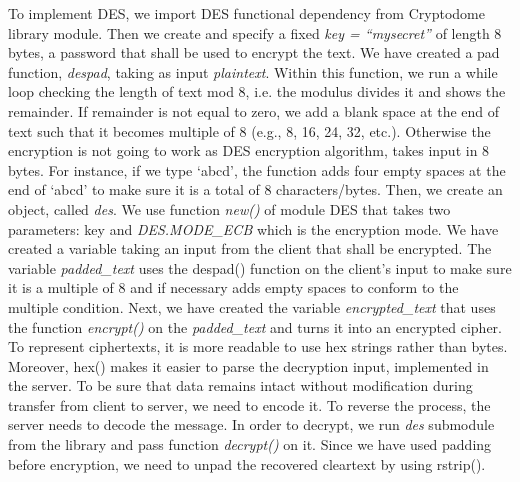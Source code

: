 To implement DES, we import DES functional dependency from Cryptodome library module. Then we create and specify a fixed \textit{key = “mysecret”} of length 8 bytes, a password that shall be used to encrypt the text. We have created a pad function, \textit{despad}, taking as input \textit{plaintext}. Within this function, we run a while loop checking the length of text mod 8, i.e. the modulus divides it and shows the remainder. If remainder is not equal to zero, we add a blank space at the end of text such that it becomes multiple of 8 (e.g., 8, 16, 24, 32, etc.). Otherwise the encryption is not going to work as DES encryption algorithm, takes input in 8 bytes. For instance, if we type ‘abcd’, the function adds four empty spaces at the end of ‘abcd’ to make sure it is a total of 8 characters/bytes. Then, we create an object, called \textit{des}. We use function \textit{new()} of module DES that takes two parameters: key and \textit{DES.MODE\_ECB} which is the encryption mode. We have created a variable taking an input from the client that shall be encrypted. The variable  \textit{padded\_text} uses the despad() function on the client's input to make sure it is a multiple of 8 and if necessary adds empty spaces to conform to the multiple condition. Next, we have created the variable \textit{encrypted\_text} that uses the function \textit{encrypt()} on the \textit{padded\_text} and turns it into an encrypted cipher. To represent ciphertexts, it is more readable to use hex strings rather than bytes. Moreover, hex() makes it easier to parse the decryption input, implemented in the server. To be sure that data remains intact without modification during transfer from client to server, we need to encode it. To reverse the process, the server needs to decode the message. In order to decrypt, we run \textit{des} submodule from the library and pass function  \textit{decrypt()} on it. Since we have used padding before encryption, we need to unpad the recovered cleartext by using rstrip(). 

